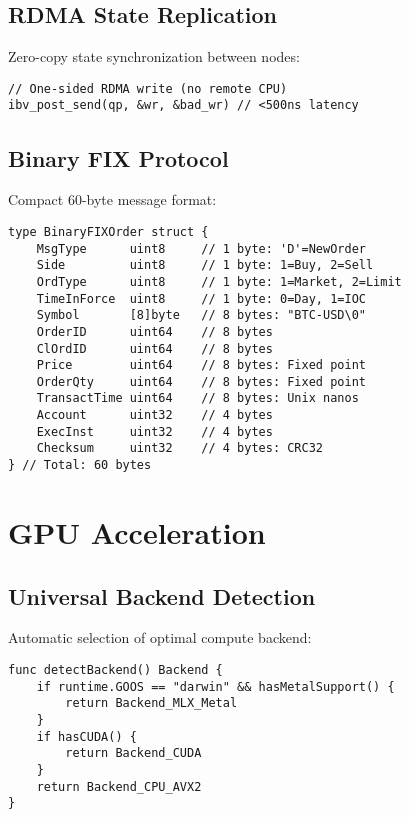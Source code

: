 \documentclass[11pt,a4paper]{article}
\begin{document}
\subsection{RDMA State Replication}

Zero-copy state synchronization between nodes:

\begin{lstlisting}
// One-sided RDMA write (no remote CPU)
ibv_post_send(qp, &wr, &bad_wr) // <500ns latency
\end{lstlisting}

\subsection{Binary FIX Protocol}

Compact 60-byte message format:

\begin{lstlisting}
type BinaryFIXOrder struct {
    MsgType      uint8     // 1 byte: 'D'=NewOrder
    Side         uint8     // 1 byte: 1=Buy, 2=Sell
    OrdType      uint8     // 1 byte: 1=Market, 2=Limit
    TimeInForce  uint8     // 1 byte: 0=Day, 1=IOC
    Symbol       [8]byte   // 8 bytes: "BTC-USD\0"
    OrderID      uint64    // 8 bytes
    ClOrdID      uint64    // 8 bytes
    Price        uint64    // 8 bytes: Fixed point
    OrderQty     uint64    // 8 bytes: Fixed point
    TransactTime uint64    // 8 bytes: Unix nanos
    Account      uint32    // 4 bytes
    ExecInst     uint32    // 4 bytes
    Checksum     uint32    // 4 bytes: CRC32
} // Total: 60 bytes
\end{lstlisting}

\section{GPU Acceleration}

\subsection{Universal Backend Detection}

Automatic selection of optimal compute backend:

\begin{lstlisting}
func detectBackend() Backend {
    if runtime.GOOS == "darwin" && hasMetalSupport() {
        return Backend_MLX_Metal
    }
    if hasCUDA() {
        return Backend_CUDA
    }
    return Backend_CPU_AVX2
}
\end{lstlisting}
\end{document}
